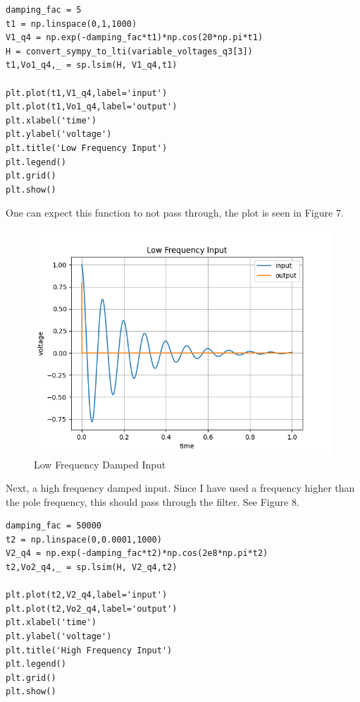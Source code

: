 \documentclass[11pt, a4paper]{article}
\begin{document}
\begin{verbatim}
damping_fac = 5
t1 = np.linspace(0,1,1000)
V1_q4 = np.exp(-damping_fac*t1)*np.cos(20*np.pi*t1)
H = convert_sympy_to_lti(variable_voltages_q3[3])
t1,Vo1_q4,_ = sp.lsim(H, V1_q4,t1)

plt.plot(t1,V1_q4,label='input')
plt.plot(t1,Vo1_q4,label='output')
plt.xlabel('time')
plt.ylabel('voltage')
plt.title('Low Frequency Input')
plt.legend()
plt.grid()
plt.show()
\end{verbatim}

One can expect this function to not pass through, the plot is seen in Figure 7.

  \begin{figure}[!tbh]
   	\centering
  \includegraphics[scale=0.5]{q4.png} 
    \caption{Low Frequency Damped Input} 	
   \end{figure} 
   
Next, a high frequency damped input. Since I have used a frequency higher than the pole frequency, this should pass through the filter. See Figure 8.
\begin{verbatim}
damping_fac = 50000
t2 = np.linspace(0,0.0001,1000)
V2_q4 = np.exp(-damping_fac*t2)*np.cos(2e8*np.pi*t2)
t2,Vo2_q4,_ = sp.lsim(H, V2_q4,t2)

plt.plot(t2,V2_q4,label='input')
plt.plot(t2,Vo2_q4,label='output')
plt.xlabel('time')
plt.ylabel('voltage')
plt.title('High Frequency Input')
plt.legend()
plt.grid()
plt.show()
\end{verbatim} 
\end{document}

